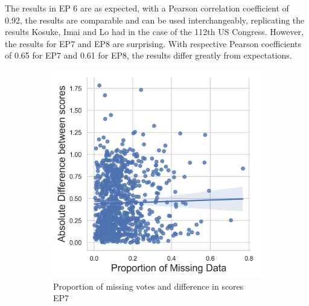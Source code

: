 \documentclass[a4paper,12pt]{report}
\begin{document}
                The results in EP 6 are as expected, with a Pearson correlation coefficient of 0.92, the results are
                comparable
                and can be used interchangeably, replicating the results Kosuke, Imai and Lo had in the case of the
                112th US
                Congress.
                However, the results for EP7 and EP8 are surprising.
                With respective Pearson coefficients of 0.65 for EP7 and 0.61 for EP8, the results differ greatly from
                expectations.
                \begin{figure}[H]
                    \centering
                    \begin{subfigure}[b]{0.48\textwidth}
                        \centering
                        \includegraphics[width=\textwidth]{Graphs/missingvsdiff7}
                        \caption{Proportion of missing votes and difference in scores EP7}
                        \label{fig:missingscatter7}
                    \end{subfigure}
                    \hfill
                    \begin{subfigure}[b]{0.48\textwidth}
                        \centering

\end{subfigure}
\end{figure}
\end{document}
